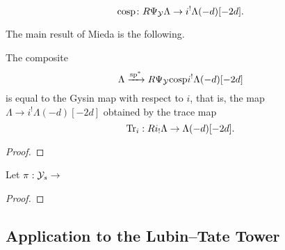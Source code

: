 \documentclass[../main.tex]{subfiles}
\begin{document}
\begin{equation*}
  \mathrm{cosp} \colon R\Psi_{\mathcal{Y}} \Lambda \to i^! \Lambda(-d)[-2d].
\end{equation*}

The main result of Mieda is the following.

\begin{thm}\label{thm:MiedaFirstStepSpecMap}
  The composite 
  $$\Lambda \xrightarrow{\mathrm{sp}^*} R \Psi_{\mathcal{Y}} \mathrm{cosp} i^! \Lambda(-d)[-2d]$$
  is equal to the Gysin map with respect to $i$, that is, the map
  $\Lambda \to i^! \Lambda(-d)[-2d]$ obtained by the trace map 
  \begin{equation*}
    \operatorname{Tr}_i: R i_! \Lambda \to \Lambda(-d)[-2d].
  \end{equation*}
\begin{proof}
\end{proof}
\end{thm}



\begin{thm}\label{thm:MiedaThmFiniteLvl}
  Let $\pi: \mathcal{Y}_s \to $
\begin{proof}
\end{proof}
\end{thm}


\subsection{Application to the Lubin--Tate Tower} %
\label{sub:Application to the Lubin--Tate Tower}
\end{document}
